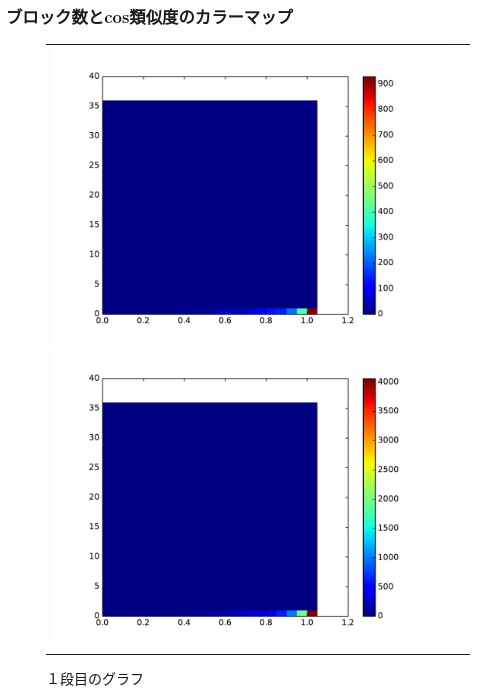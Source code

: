 \documentclass[twocolumn,9pt,a4paper]{jsarticle}
\begin{document}
\newpage
 \subsubsection{ブロック数とcos類似度のカラーマップ}
\begin{figure}[ht]
 \begin{tabular}{cc}
 	\begin{minipage}[t]{0.45\hsize}
	 \centering
	 \includegraphics[keepaspectratio, scale = 0.2]{colormap_block_1.pdf}
	 \caption{１段目のグラフ}
	 \label{first_splite}
	\end{minipage}
        \begin{minipage}[t]{0.45\hsize}
	 \centering
	 \includegraphics[keepaspectratio, scale = 0.2]{colormap_block_2.pdf}

\end{minipage}
\end{tabular}
\end{figure}
\end{document}
